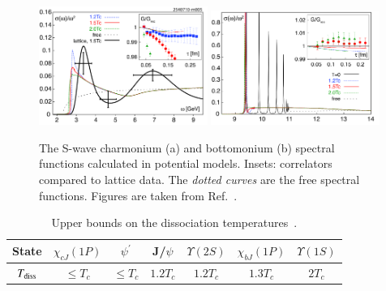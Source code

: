 \begin{figure}[]
   \begin{center}
      {\includegraphics[width=0.49\textwidth]{Figures/JPsi_SpecFuncLattQCD.png}}
      {\includegraphics[width=0.49\textwidth]{Figures/Y1S_SpecFuncLattQCD.png}}
      \caption{The S-wave charmonium (a) and 
        bottomonium (b) spectral 
        functions calculated in potential 
        models. 
        Insets: correlators compared to lattice data.  
        The {\it dotted curves} are the
        free spectral functions. Figures are taken from Ref.~\cite{Mocsy:2007yj}.
      }
      \label{Fig:QuarkoniaSpecFuncLattice} 
   \end{center}
\end{figure}





\begin{table}[tb]
   \caption{Upper bounds on the dissociation 
             temperatures~\cite{Mocsy:2007jz}.
             }
   \label{tab:LatticeDissTemp}
   \setlength{\tabcolsep}{0.41pc}
   \begin{center}
      \begin{tabular}{ccccccc}
      \hline\hline
      State & $\chi_{cJ}(1P)$ & $\psi^{'}$ &J/$\psi$  &$\Upsilon(2S)$ & $\chi_{bJ}(1P)$ &$\Upsilon(1S)$ \\%
      \hline 
      $T_{\rm diss}$ & $\le T_c$ & $\le T_c$ & $1.2T_c$ & $1.2T_c$ & $1.3T_c$ & $2T_c$\\ 
\hline\hline
\end{tabular}
\end{center}
\end{table}



